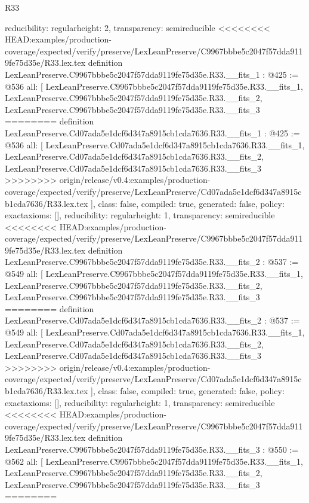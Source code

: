 \begin{lexlean}{R33}
\begin{coremodule}
{{{{{{{{{  reducibility: regular{height: 2},
  transparency: semireducible
}
<<<<<<<< HEAD:examples/production-coverage/expected/verify/preserve/LexLeanPreserve/C9967bbbe5c2047f57dda9119fe75d35e/R33.lex.tex
definition LexLeanPreserve.C9967bbbe5c2047f57dda9119fe75d35e.R33.__fits_1 : @425 := @536 {
  all: [
    LexLeanPreserve.C9967bbbe5c2047f57dda9119fe75d35e.R33.__fits_1,
    LexLeanPreserve.C9967bbbe5c2047f57dda9119fe75d35e.R33.__fits_2,
    LexLeanPreserve.C9967bbbe5c2047f57dda9119fe75d35e.R33.__fits_3
========
definition LexLeanPreserve.Cd07ada5e1dcf6d347a8915cb1cda7636.R33.__fits_1 : @425 := @536 {
  all: [
    LexLeanPreserve.Cd07ada5e1dcf6d347a8915cb1cda7636.R33.__fits_1,
    LexLeanPreserve.Cd07ada5e1dcf6d347a8915cb1cda7636.R33.__fits_2,
    LexLeanPreserve.Cd07ada5e1dcf6d347a8915cb1cda7636.R33.__fits_3
>>>>>>>> origin/release/v0.4:examples/production-coverage/expected/verify/preserve/LexLeanPreserve/Cd07ada5e1dcf6d347a8915cb1cda7636/R33.lex.tex
  ],
  class: false,
  compiled: true,
  generated: false,
  policy: exact{axioms: []},
  reducibility: regular{height: 1},
  transparency: semireducible
}
<<<<<<<< HEAD:examples/production-coverage/expected/verify/preserve/LexLeanPreserve/C9967bbbe5c2047f57dda9119fe75d35e/R33.lex.tex
definition LexLeanPreserve.C9967bbbe5c2047f57dda9119fe75d35e.R33.__fits_2 : @537 := @549 {
  all: [
    LexLeanPreserve.C9967bbbe5c2047f57dda9119fe75d35e.R33.__fits_1,
    LexLeanPreserve.C9967bbbe5c2047f57dda9119fe75d35e.R33.__fits_2,
    LexLeanPreserve.C9967bbbe5c2047f57dda9119fe75d35e.R33.__fits_3
========
definition LexLeanPreserve.Cd07ada5e1dcf6d347a8915cb1cda7636.R33.__fits_2 : @537 := @549 {
  all: [
    LexLeanPreserve.Cd07ada5e1dcf6d347a8915cb1cda7636.R33.__fits_1,
    LexLeanPreserve.Cd07ada5e1dcf6d347a8915cb1cda7636.R33.__fits_2,
    LexLeanPreserve.Cd07ada5e1dcf6d347a8915cb1cda7636.R33.__fits_3
>>>>>>>> origin/release/v0.4:examples/production-coverage/expected/verify/preserve/LexLeanPreserve/Cd07ada5e1dcf6d347a8915cb1cda7636/R33.lex.tex
  ],
  class: false,
  compiled: true,
  generated: false,
  policy: exact{axioms: []},
  reducibility: regular{height: 1},
  transparency: semireducible
}
<<<<<<<< HEAD:examples/production-coverage/expected/verify/preserve/LexLeanPreserve/C9967bbbe5c2047f57dda9119fe75d35e/R33.lex.tex
definition LexLeanPreserve.C9967bbbe5c2047f57dda9119fe75d35e.R33.__fits_3 : @550 := @562 {
  all: [
    LexLeanPreserve.C9967bbbe5c2047f57dda9119fe75d35e.R33.__fits_1,
    LexLeanPreserve.C9967bbbe5c2047f57dda9119fe75d35e.R33.__fits_2,
    LexLeanPreserve.C9967bbbe5c2047f57dda9119fe75d35e.R33.__fits_3
========
}}}}}}}}}}}
\end{coremodule}
\end{lexlean}

